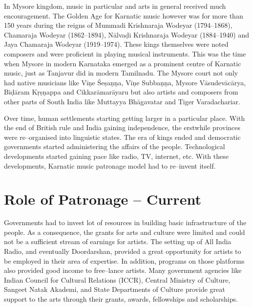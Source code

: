 In Mysore kingdom, music in particular and arts in general received much encouragement. The Golden Age for Karnatic music however was for more than 150 years during the reigns of Mummadi Krishnaraja Wodeyar (1794–1868), Chamaraja Wodeyar (1862–1894), Nālvaḍi Krishnaraja Wodeyar (1884–1940) and Jaya Chamaraja Wodeyar (1919–1974). These kings themselves were noted composers and were proficient in playing musical instruments. This was the time when Mysore in modern Karnataka emerged as a prominent centre of Karnatic music, just as Tanjavur did in modern Tamilnadu. The Mysore court not only had native musicians like Vīṇe Śeṣaṇṇa, Vīṇe Subbaṇṇa, Mysore Vāsudevācārya, Biḍāram Kṛṣṇappa and Cikkarāmarāyaru but also artists and composers from other parts of South India like Muttayya Bhāgavatar and Tiger Varadachariar.

Over time, human settlements starting getting larger in a particular place. With the end of British rule and India gaining independence, the erstwhile provinces were re–organised into linguistic states. The era of kings ended and democratic governments started administering the affairs of the people. Technological developments started gaining pace like radio, TV, internet, etc. With these developments, Karnatic music patronage model had to re–invent itself.

\vspace{-.4cm}

\section*{Role of Patronage – Current}

\vspace{-.2cm}

Governments had to invest lot of resources in building basic infrastructure of the people. As a consequence, the grants for arts and culture were limited and could not be a sufficient stream of earnings for artists. The setting up of All India Radio, and eventually Doordarshan, provided a great opportunity for artists to be employed in their area of expertise. In addition, programs on those platforms also provided good income to free–lance artists. Many government agencies like Indian Council for Cultural Relations (ICCR), Central Ministry of Culture, Sangeet Natak Akademi, and State Departments of Culture provide great support to the arts through their grants, awards, fellowships and scholarships.

